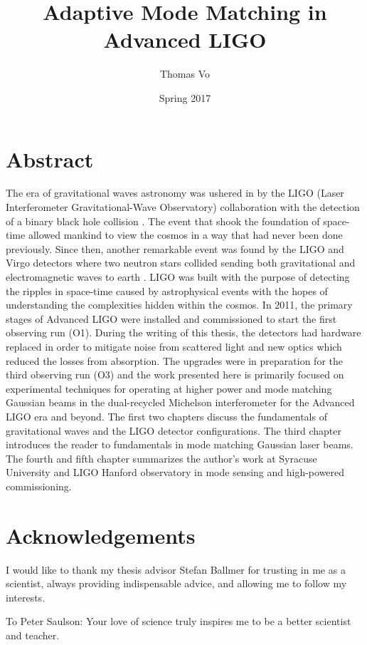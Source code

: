 \documentclass[oneside,12pt]{book}
\title{Adaptive Mode Matching in Advanced LIGO}
\date{Spring 2017}
\author{Thomas Vo}
\begin{document}
	
\doublespacing

	\chapter*{Abstract}
	The era of gravitational waves astronomy was ushered in by the LIGO (Laser Interferometer Gravitational-Wave Observatory) collaboration with the detection of a binary black hole collision \cite{DetectionPaper}.  The event that shook the foundation of space-time allowed mankind to view the cosmos in a way that had never been done previously. Since then, another remarkable event was found by the LIGO and Virgo detectors where two neutron stars collided sending both gravitational and electromagnetic waves to earth \cite{BNS}. LIGO was built with the purpose of detecting the ripples in space-time caused by astrophysical events with the hopes of understanding the complexities hidden within the cosmos.  In 2011, the primary stages of Advanced LIGO were installed and commissioned to start the first observing run (O1).  During the writing of this thesis, the detectors had hardware replaced in order to mitigate noise from scattered light and new optics which reduced the losses from absorption.  The upgrades were in preparation for the third observing run (O3) and the work presented here is primarily focused on experimental techniques for operating at higher power and mode matching Gaussian beams in the dual-recycled Michelson interferometer for the Advanced LIGO era and beyond.  The first two chapters discuss the fundamentals of gravitational waves and the LIGO detector configurations.  The third chapter introduces the reader to fundamentals in mode matching Gaussian laser beams.  The fourth and fifth chapter summarizes the author's work at Syracuse University and LIGO Hanford observatory in mode sensing and high-powered commissioning. 
	
	\maketitle

\chapter*{Acknowledgements}

I would like to thank my thesis advisor Stefan Ballmer for trusting in me as a scientist, always providing indispensable advice, and allowing me to follow my interests.

To Peter Saulson: Your love of science truly inspires me to be a better scientist and teacher.
\end{document}
